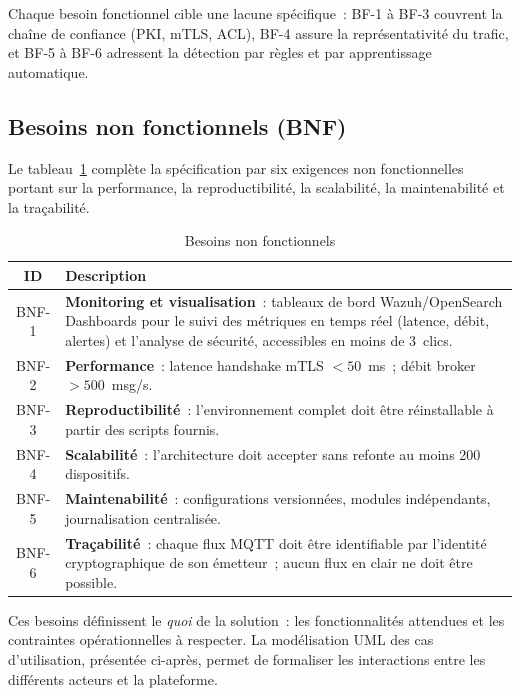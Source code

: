 Chaque besoin fonctionnel cible une lacune spécifique~: BF-1 à BF-3 couvrent la chaîne de confiance (PKI, mTLS, ACL), BF-4 assure la représentativité du trafic, et BF-5 à BF-6 adressent la détection par règles et par apprentissage automatique.

\subsection{Besoins non fonctionnels (BNF)}

Le tableau~\ref{tab:bnf} complète la spécification par six exigences non fonctionnelles portant sur la performance, la reproductibilité, la scalabilité, la maintenabilité et la traçabilité.

\begin{table}[!htbp]
\centering
\caption{Besoins non fonctionnels}
\label{tab:bnf}
\begin{tabularx}{\linewidth}{|c|>{\raggedright\arraybackslash}X|}
\hline
\textbf{ID} & \textbf{Description} \\
\hline
BNF-1 & \textbf{Monitoring et visualisation}~: tableaux de bord Wazuh/OpenSearch Dashboards pour le suivi des métriques en temps réel (latence, débit, alertes) et l'analyse de sécurité, accessibles en moins de 3~clics. \\ \hline
BNF-2 & \textbf{Performance}~: latence handshake mTLS \(<50\)~ms~; débit broker \(>500\)~msg/s. \\ \hline
BNF-3 & \textbf{Reproductibilité}~: l'environnement complet doit être réinstallable à partir des scripts fournis. \\ \hline
BNF-4 & \textbf{Scalabilité}~: l'architecture doit accepter sans refonte au moins 200 dispositifs. \\ \hline
BNF-5 & \textbf{Maintenabilité}~: configurations versionnées, modules indépendants, journalisation centralisée. \\ \hline
BNF-6 & \textbf{Traçabilité}~: chaque flux MQTT doit être identifiable par l'identité cryptographique de son émetteur~; aucun flux en clair ne doit être possible. \\ \hline
\end{tabularx}
\end{table}

Ces besoins définissent le \emph{quoi} de la solution~: les fonctionnalités attendues et les contraintes opérationnelles à respecter. La modélisation UML des cas d'utilisation, présentée ci-après, permet de formaliser les interactions entre les différents acteurs et la plateforme.

